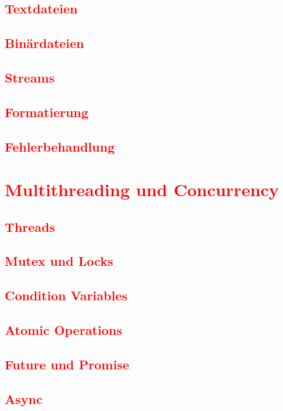 \section{\textcolor{red}{Textdateien}}\label{sec:text-files}
\section{\textcolor{red}{Binärdateien}}\label{sec:binary-files}
\section{\textcolor{red}{Streams}}\label{sec:streams}
\section{\textcolor{red}{Formatierung}}\label{sec:formatting}
\section{\textcolor{red}{Fehlerbehandlung}}\label{sec:error-handling}


\chapter{\textcolor{red}{Multithreading und Concurrency}}\label{chap:multithreading}
\section{\textcolor{red}{Threads}}\label{sec:threads}
\section{\textcolor{red}{Mutex und Locks}}\label{sec:mutex-locks}
\section{\textcolor{red}{Condition Variables}}\label{sec:condition-variables}
\section{\textcolor{red}{Atomic Operations}}\label{sec:atomic-operations}
\section{\textcolor{red}{Future und Promise}}\label{sec:future-promise}
\section{\textcolor{red}{Async}}\label{sec:async}
